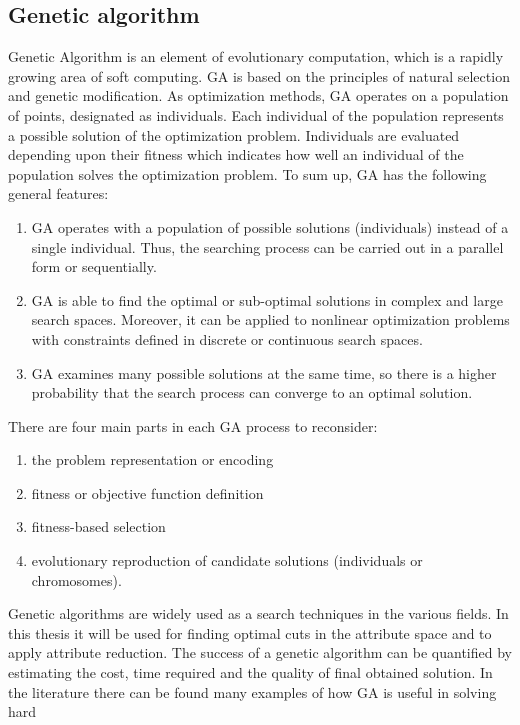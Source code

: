 \subsection{Genetic algorithm}
\label{cha:Genetic_algorithm}
Genetic Algorithm is an element of evolutionary computation, which is a 
rapidly growing area of soft computing. GA is based on the principles of
natural selection and genetic modification. As optimization methods, GA 
operates on a population of points, designated as individuals. Each 
individual of the population represents a possible solution of the 
optimization problem. Individuals are evaluated depending upon their 
fitness which indicates how well an individual of the population solves 
the optimization problem. To sum up, GA has the following general features:
\begin{enumerate}
    \item GA operates with a population of possible solutions (individuals) 
        instead of a single individual. Thus, the searching process can be 
        carried out in a parallel form or sequentially.
    \item GA is able to find the optimal or sub-optimal solutions in complex
        and large search spaces. Moreover, it can be applied to nonlinear 
        optimization problems with constraints defined in discrete or continuous 
        search spaces.
    \item GA examines many possible solutions at the same time, so there is a 
        higher probability that the search process can converge to an optimal solution.
\end{enumerate}
There are four main parts in each GA process to reconsider:
\begin{enumerate}
    \item the problem representation or encoding
    \item fitness or objective function definition
    \item fitness-based selection
    \item evolutionary reproduction of candidate solutions (individuals or chromosomes). 
\end{enumerate}
Genetic algorithms are widely used as a search techniques in the various fields. 
In this thesis it will be used for finding optimal cuts in the attribute space and to 
apply attribute reduction. The success of a genetic algorithm can be quantified by estimating 
the cost, time required and the quality of final obtained solution. 
In the literature there can be found many examples of how GA is useful in solving hard 
